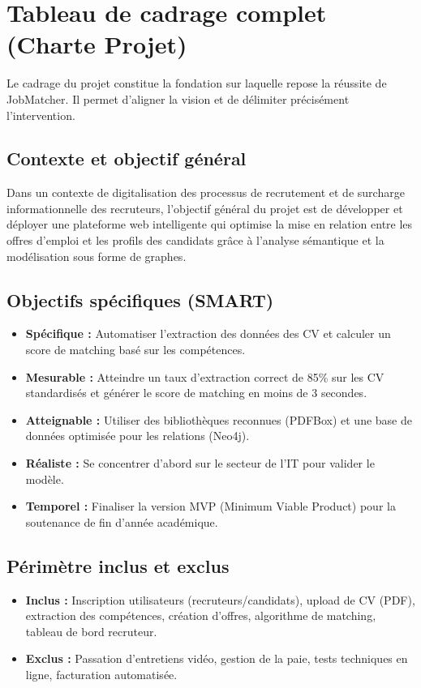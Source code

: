 \documentclass[12pt,a4paper]{report}
\begin{document}
\section{Tableau de cadrage complet (Charte Projet)}

Le cadrage du projet constitue la fondation sur laquelle repose la réussite de JobMatcher. Il permet d'aligner la vision et de délimiter précisément l'intervention.

\subsection{Contexte et objectif général}
Dans un contexte de digitalisation des processus de recrutement et de surcharge informationnelle des recruteurs, l'objectif général du projet est de développer et déployer une plateforme web intelligente qui optimise la mise en relation entre les offres d'emploi et les profils des candidats grâce à l'analyse sémantique et la modélisation sous forme de graphes.

\subsection{Objectifs spécifiques (SMART)}
\begin{itemize}
    \item \textbf{Spécifique :} Automatiser l'extraction des données des CV et calculer un score de matching basé sur les compétences.
    \item \textbf{Mesurable :} Atteindre un taux d'extraction correct de 85\% sur les CV standardisés et générer le score de matching en moins de 3 secondes.
    \item \textbf{Atteignable :} Utiliser des bibliothèques reconnues (PDFBox) et une base de données optimisée pour les relations (Neo4j).
    \item \textbf{Réaliste :} Se concentrer d'abord sur le secteur de l'IT pour valider le modèle.
    \item \textbf{Temporel :} Finaliser la version MVP (Minimum Viable Product) pour la soutenance de fin d'année académique.
\end{itemize}

\subsection{Périmètre inclus et exclus}
\begin{itemize}
    \item \textbf{Inclus :} Inscription utilisateurs (recruteurs/candidats), upload de CV (PDF), extraction des compétences, création d'offres, algorithme de matching, tableau de bord recruteur.
    \item \textbf{Exclus :} Passation d'entretiens vidéo, gestion de la paie, tests techniques en ligne, facturation automatisée.
\end{itemize}
\end{document}
